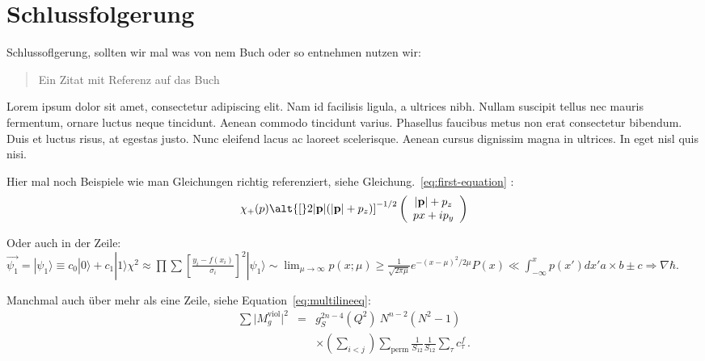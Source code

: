 \documentclass[aps,twocolumn,secnumarabic,nobalancelastpage,amsmath,amssymb,
nofootinbib,superscriptaddress]{revtex4-1}
\begin{document}
\section{Schlussfolgerung}

Schlussoflgerung, sollten wir mal was von nem Buch oder so entnehmen nutzen wir:


\begin{quote}
  Ein Zitat mit Referenz auf das Buch\cite{melissinos1966}
\end{quote}

Lorem ipsum dolor sit amet, consectetur adipiscing elit. Nam id facilisis ligula,
a ultrices nibh. Nullam suscipit tellus nec mauris fermentum, ornare luctus neque
tincidunt. Aenean commodo tincidunt varius. Phasellus faucibus metus non erat
consectetur bibendum. Duis et luctus risus, at egestas justo. Nunc eleifend lacus
ac laoreet scelerisque. Aenean cursus dignissim magna in ultrices. In eget nisl
quis nisi.

Hier mal noch Beispiele wie man Gleichungen richtig referenziert, siehe
Gleichung.~\ref{eq:first-equation} :
\begin{equation}
   \chi_+(p)\alt{\bf [}2|{\bf p}|(|{\bf p}|+p_z){\bf ]}^{-1/2}
   \left(
   \begin{array}{c}
      |{\bf p}|+p_z\\
      px+ip_y
   \end{array}\right)
   \label{eq:first-equation}
\end{equation}


Oder auch in der Zeile: $\vec{\psi_1} = |\psi_1\rangle \equiv c_0|0\rangle +
c_1|1\rangle \chi^2 \approx
\prod\sum\left[\frac{y_i-f(x_i)}{\sigma_i}\right]^2 |\psi_1\rangle
\sim \lim_{\mu \rightarrow \infty}p(x;\mu) \geq \frac{1}{\sqrt{2 \pi
\mu}} e^{-(x-\mu)^2 / 2\mu}P(x) \ll \int_{-\infty}^x p(x')dx'a
\times b \pm c \Rightarrow \nabla \hbar$.

Manchmal auch über mehr als eine Zeile, siehe Equation~\ref{eq:multilineeq}:
\begin{eqnarray}
  \sum \vert M^{\text{viol}}_g \vert ^2
   &=&  g^{2n-4}_S(Q^2)~N^{n-2} (N^2-1)
\nonumber
\\
   &&   \times \left( \sum_{i<j}\right) \sum_{\text{perm}}
            \frac{1}{S_{12}}  \frac{1}{S_{12}} \sum_\tau c^f_\tau
\,.
\label{eq:multilineeq}
\end{eqnarray}
\end{document}

